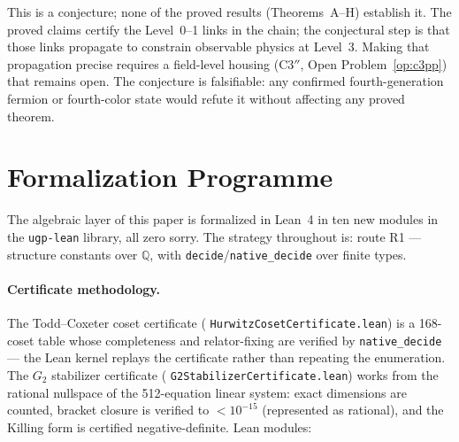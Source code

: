 \documentclass[11pt]{article}
\theoremstyle{remark}
\newcommand{\lean}[1]{%
  \penalty-100
  \begingroup\def\_{\textunderscore\allowbreak}\texttt{#1}\endgroup}
\begin{document}
This is a conjecture; none of the proved results (Theorems~A--H) establish it.
The proved claims certify the Level~0--1 links in the chain; the conjectural
step is that those links propagate to constrain observable physics at Level~3.
Making that propagation precise requires a field-level housing (C$3''$,
Open Problem~\ref{op:c3pp}) that remains open.
The conjecture is falsifiable: any confirmed fourth-generation fermion or
fourth-color state would refute it without affecting any proved theorem.

\section{Formalization Programme}
\label{sec:lean}

The algebraic layer of this paper is formalized in Lean~4 in ten new modules
in the \texttt{ugp-lean} library, all zero sorry.
The strategy throughout is: route R1 --- structure constants over $\mathbb{Q}$,
with \texttt{decide}/\texttt{native\_decide} over finite types.

\paragraph{Certificate methodology.}
The Todd--Coxeter coset certificate (\lean{HurwitzCosetCertificate.lean}) is
a 168-coset table whose completeness and relator-fixing are verified by
\texttt{native\_decide} --- the Lean kernel replays the certificate rather than
repeating the enumeration.
The $G_2$ stabilizer certificate (\lean{G2StabilizerCertificate.lean})
works from the rational nullspace of the 512-equation linear system: exact
dimensions are counted, bracket closure is verified to $<10^{-15}$ (represented
as rational), and the Killing form is certified negative-definite.
Lean modules:
\end{document}
